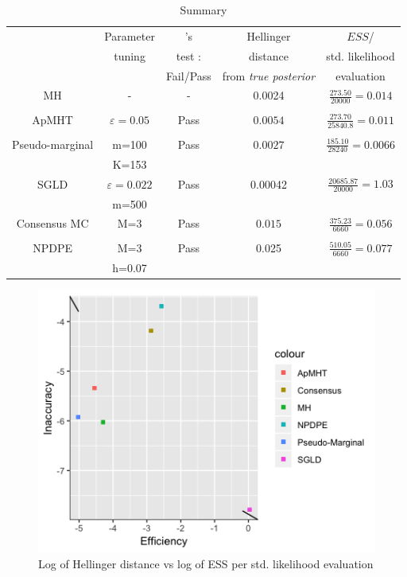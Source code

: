 \documentclass[11pt,a4paper]{report}\usepackage[]{graphicx}\usepackage[]{color}
\begin{document}
\label{DGP3}
\begin{table}[H]
    \centering
    \caption{Summary}
    \label{tab3}
    \begin{tabular}{ccccc}
\hline
&Parameter &\cite{geweke2004getting}'s & Hellinger & $ESS$/\\
&tuning&test :&distance&std. likelihood\\
&&  Fail/Pass &  from \textit{true posterior} &    evaluation\\

\hline
MH &-& - & 0.0024 & $\frac{273.50}{20000}=0.014$ \\
&&&&\\
\hline
ApMHT &$\varepsilon=0.05$& Pass & $0.0054$ & $\frac{273.70}{25840.8}=0.011$ \\
&&&&\\
\hline
Pseudo-marginal &m=100& Pass & $0.0027$ &$\frac{185.10}{28240}=0.0066$\\
&K=153&&&\\
\hline
SGLD &$\varepsilon=0.022$& Pass &0.00042&$\frac{20685.87}{20000}=1.03$\\
&m=500&&&\\
\hline
Consensus MC &M=3& Pass & $0.015$ & $\frac{375.23}{6660}=0.056$\\
&&&&\\
\hline
NPDPE &M=3& Pass &0.025&$\frac{510.05}{6660}=0.077$\\
&h=0.07&&&
\end{tabular}
\end{table}

\begin{figure}[H]
\caption{Log of Hellinger distance vs log of ESS per std. likelihood evaluation}
\label{HD3}
\centering

  \includegraphics[resolution=110]{DGP3_plots/DGP3_HD_ESS.png}

\end{figure}
\end{document}
